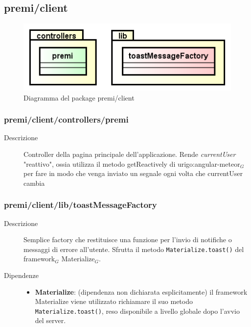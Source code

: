 \clearpage
\subsection{premi/client}
\begin{figure}[H]
\begin{center}
\includegraphics[scale=0.80]{img/diapkg/client.png}
\caption{Diagramma del package premi/client}
\end{center}
\end{figure}

\subsubsection{premi/client/controllers/premi}

\begin{description}
\item[Descrizione] \hfill
	Controller della pagina principale dell'applicazione. Rende \textit{currentUser} "reattivo", ossia utilizza il metodo getReactively di urigo:angular-meteor$_G$ per fare in modo che venga inviato un segnale ogni volta che currentUser cambia
\end{description}

\subsubsection{premi/client/lib/toastMessageFactory}

\begin{description}
\item[Descrizione] \hfill
	Semplice factory che restituisce una funzione per l'invio di notifiche o messaggi di errore all'utente. Sfrutta il metodo \texttt{Materialize.toast()} del framework$_G$ Materialize$_G$.
\item[Dipendenze] \hfill
	\begin{itemize}
		\item \textbf{Materialize}: (dipendenza non dichiarata esplicitamente) il framework Materialize viene utilizzato richiamare il suo metodo \texttt{Materialize.toast()}, reso disponibile a livello globale dopo l'avvio del server.
	\end{itemize}
\end{description}

